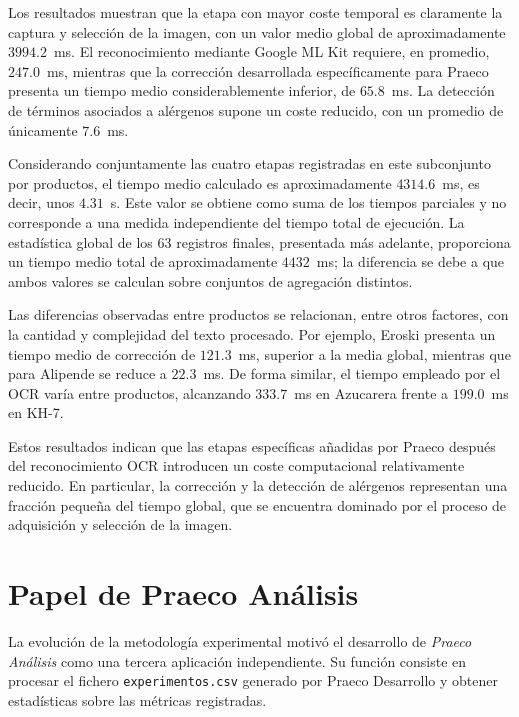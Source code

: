Los resultados muestran que la etapa con mayor coste temporal es claramente la captura y selección de la imagen, con un valor medio global de aproximadamente $3994.2$~ms. El reconocimiento mediante Google ML Kit requiere, en promedio, $247.0$~ms, mientras que la corrección desarrollada específicamente para Praeco presenta un tiempo medio considerablemente inferior, de $65.8$~ms. La detección de términos asociados a alérgenos supone un coste reducido, con un promedio de únicamente $7.6$~ms.

Considerando conjuntamente las cuatro etapas registradas en este subconjunto por productos, el tiempo medio calculado es aproximadamente $4314.6$~ms, es decir, unos $4.31$~s. Este valor se obtiene como suma de los tiempos parciales y no corresponde a una medida independiente del tiempo total de ejecución. La estadística global de los 63 registros finales, presentada más adelante, proporciona un tiempo medio total de aproximadamente $4432$~ms; la diferencia se debe a que ambos valores se calculan sobre conjuntos de agregación distintos.

Las diferencias observadas entre productos se relacionan, entre otros factores, con la cantidad y complejidad del texto procesado. Por ejemplo, Eroski presenta un tiempo medio de corrección de $121.3$~ms, superior a la media global, mientras que para Alipende se reduce a $22.3$~ms. De forma similar, el tiempo empleado por el OCR varía entre productos, alcanzando $333.7$~ms en Azucarera frente a $199.0$~ms en KH-7.

Estos resultados indican que las etapas específicas añadidas por Praeco después del reconocimiento OCR introducen un coste computacional relativamente reducido. En particular, la corrección y la detección de alérgenos representan una fracción pequeña del tiempo global, que se encuentra dominado por el proceso de adquisición y selección de la imagen.

\section{Papel de Praeco Análisis}

La evolución de la metodología experimental motivó el desarrollo de \textit{Praeco Análisis} como una tercera aplicación independiente. Su función consiste en procesar el fichero \texttt{experimentos.csv} generado por Praeco Desarrollo y obtener estadísticas sobre las métricas registradas.

